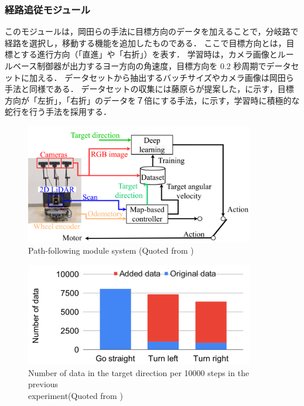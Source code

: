 \clearpage
\subsubsection{経路追従モジュール}
このモジュールは，岡田らの手法に目標方向のデータを加えることで，分岐路で経路を選択し，移動する機能を追加したものである．
ここで目標方向とは，目標とする進行方向（「直進」や「右折」）を表す．
学習時は，カメラ画像とルールベース制御器が出力するヨー方向の角速度，目標方向を 0.2 秒周期でデータセットに加える．
データセットから抽出するバッチサイズやカメラ画像は岡田ら手法と同様である．
データセットの収集には藤原ら\cite{fujiwara2023}が提案した，に示す，目標方向が「左折」，「右折」のデータを７倍にする手法，に示す，学習時に積極的な蛇行を行う手法を採用する．

\begin{figure}[htbp]
  \centering
  \includegraphics[width=100mm]{images/pdf/haruyama/pathfollow_sys.pdf}
  \caption[Path-following module system]{Path-following module system (Quoted from \cite{haruyama2023})}
  \label{fig:pathfollow}
\end{figure}

\begin{figure}[htbp]
  \centering
  \includegraphics[width=100mm]{images/pdf/fujiwara/oversample.pdf}
  \caption[Number of data in the target direction per 10000 steps in the previous experiment]{Number of data in the target direction per 10000 steps in the previous \\
  experiment(Quoted from \cite{fujiwara2023})}
  \label{fig:oversample}
\end{figure}

